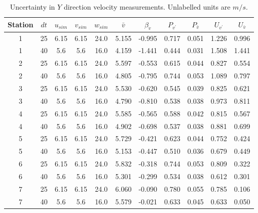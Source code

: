 \renewcommand\baselinestretch{1.3}\selectfont
\begin{table}[H]
\begin{center}
\begin{tabular}{|ccccccccccc|}
	\hline
	Station & $dt$ & $u_{sim}$ & $v_{sim}$ & $w_{sim}$ & $\bar{v}$ & $\beta_v$ & $P_{v^{\prime}}$ & $P_{\bar{v}}$ & $U_{v^{\prime}}$ & $U_{\bar{v}}$\\
	\hline
	1 & 25 & 6.15 & 6.15 & 24.0 & 5.155 & -0.995 & 0.717 & 0.051 & 1.226 & 0.996\\
	1 & 40 & 5.6 & 5.6 & 16.0 & 4.159 & -1.441 & 0.444 & 0.031 & 1.508 & 1.441\\
	2 & 25 & 6.15 & 6.15 & 24.0 & 5.597 & -0.553 & 0.615 & 0.044 & 0.827 & 0.554\\
	2 & 40 & 5.6 & 5.6 & 16.0 & 4.805 & -0.795 & 0.744 & 0.053 & 1.089 & 0.797\\
	3 & 25 & 6.15 & 6.15 & 24.0 & 5.530 & -0.620 & 0.545 & 0.039 & 0.825 & 0.621\\
	3 & 40 & 5.6 & 5.6 & 16.0 & 4.790 & -0.810 & 0.538 & 0.038 & 0.973 & 0.811\\
	4 & 25 & 6.15 & 6.15 & 24.0 & 5.585 & -0.565 & 0.588 & 0.042 & 0.815 & 0.567\\
	4 & 40 & 5.6 & 5.6 & 16.0 & 4.902 & -0.698 & 0.537 & 0.038 & 0.881 & 0.699\\
	5 & 25 & 6.15 & 6.15 & 24.0 & 5.729 & -0.421 & 0.623 & 0.044 & 0.752 & 0.424\\
	5 & 40 & 5.6 & 5.6 & 16.0 & 5.153 & -0.447 & 0.510 & 0.036 & 0.679 & 0.449\\
	6 & 25 & 6.15 & 6.15 & 24.0 & 5.832 & -0.318 & 0.744 & 0.053 & 0.809 & 0.322\\
	6 & 40 & 5.6 & 5.6 & 16.0 & 5.301 & -0.299 & 0.534 & 0.038 & 0.612 & 0.301\\
	7 & 25 & 6.15 & 6.15 & 24.0 & 6.060 & -0.090 & 0.780 & 0.055 & 0.785 & 0.106\\
	7 & 40 & 5.6 & 5.6 & 16.0 & 5.579 & -0.021 & 0.633 & 0.045 & 0.633 & 0.050\\
	\hline
\end{tabular}
\caption{Uncertainty in $Y$ direction velocity measurements. Unlabelled units are $m/s$.}
\label{table:uncertainties_v}
\end{center}
\end{table}
\renewcommand\baselinestretch{2}\selectfont
